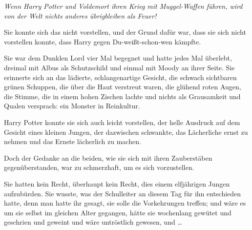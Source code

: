 \emph{Wenn Harry Potter und Voldemort ihren Krieg mit Muggel-Waffen führen, wird von der Welt nichts anderes übrigbleiben als Feuer!}

Sie konnte sich das nicht vorstellen, und der Grund dafür war, dass sie sich nicht vorstellen konnte, dass Harry gegen Du-weißt-schon-wen kämpfte.

Sie war dem Dunklen Lord vier Mal begegnet und hatte jedes Mal überlebt, dreimal mit Albus als Schutzschild und einmal mit Moody an ihrer Seite. Sie erinnerte sich an das lädierte, schlangenartige Gesicht, die schwach sichtbaren grünen Schuppen, die über die Haut verstreut waren, die glühend roten Augen, die Stimme, die in einem hohen Zischen lachte und nichts als Grausamkeit und Qualen versprach: ein Monster in Reinkultur.

Harry Potter konnte sie sich auch leicht vorstellen, der helle Ausdruck auf dem Gesicht eines kleinen Jungen, der dazwischen schwankte, das Lächerliche ernst zu nehmen und das Ernste lächerlich zu machen.

Doch der Gedanke an die beiden, wie sie sich mit ihren Zauberstäben gegenüberstanden, war zu schmerzhaft, um es sich vorzustellen.

Sie hatten kein Recht, überhaupt kein Recht, dies einem elfjährigen Jungen aufzubürden. Sie wusste, was der Schulleiter an diesem Tag für ihn entschieden hatte, denn man hatte ihr gesagt, sie solle die Vorkehrungen treffen; und wäre es um sie selbst im gleichen Alter gegangen, hätte sie wochenlang gewütet und geschrien und geweint und wäre untröstlich gewesen, und …

